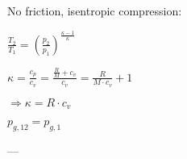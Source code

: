 No friction, isentropic compression:  

\( \frac{T_2}{T_1} = \left( \frac{p_2}{p_1} \right)^{\frac{\kappa - 1}{\kappa}} \)  

\( \kappa = \frac{c_p}{c_v} = \frac{\frac{R}{M} + c_v}{c_v} = \frac{R}{M \cdot c_v} + 1 \)  

\( \Rightarrow \kappa = R \cdot c_v \)  

\( p_{g,12} = p_{g,1} \)  

---